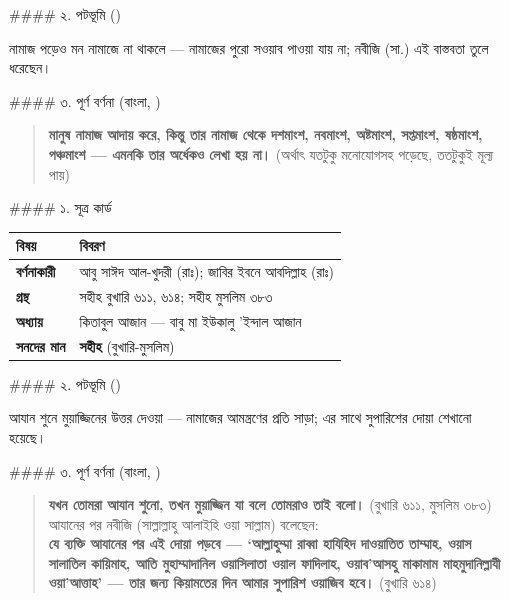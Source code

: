 \#\#\#\# ২. পটভূমি ()

নামাজ পড়েও মন নামাজে না থাকলে — নামাজের পুরো সওয়াব পাওয়া যায় না; নবীজি (সা.) এই বাস্তবতা তুলে ধরেছেন।

\#\#\#\# ৩. পূর্ণ বর্ণনা (বাংলা, )

\begin{quote}
\textbf{মানুষ নামাজ আদায় করে, কিন্তু তার নামাজ থেকে দশমাংশ, নবমাংশ, অষ্টমাংশ, সপ্তমাংশ, ষষ্ঠমাংশ, পঞ্চমাংশ — এমনকি তার অর্ধেকও লেখা হয় না।} (অর্থাৎ যতটুকু মনোযোগসহ পড়েছে, ততটুকুই মূল্য পায়)
\end{quote}

\#\#\#\# ১. সূত্র কার্ড

\begin{table}[h]\centering\small
\begin{tabular}{ll}
বিষয় & বিবরণ \\
\hline
\textbf{বর্ণনাকারী} & আবু সাঈদ আল-খুদরী (রাঃ); জাবির ইবনে আবদিল্লাহ (রাঃ) \\
\textbf{গ্রন্থ} & সহীহ বুখারি ৬১১, ৬১৪; সহীহ মুসলিম ৩৮৩ \\
\textbf{অধ্যায়} & কিতাবুল আজান — বাবু মা ইউকালু 'ইন্দাল আজান \\
\textbf{সনদের মান} & \textbf{সহীহ} (বুখারি-মুসলিম) \\
\hline
\end{tabular}
\end{table}

\#\#\#\# ২. পটভূমি ()

আযান শুনে মুয়াজ্জিনের উত্তর দেওয়া — নামাজের আমন্ত্রণের প্রতি সাড়া; এর সাথে সুপারিশের দোয়া শেখানো হয়েছে।

\#\#\#\# ৩. পূর্ণ বর্ণনা (বাংলা, )

\begin{quote}
\textbf{যখন তোমরা আযান শুনো, তখন মুয়াজ্জিন যা বলে তোমরাও তাই বলো।} (বুখারি ৬১১, মুসলিম ৩৮৩) \\
আযানের পর নবীজি (সাল্লাল্লাহু আলাইহি ওয়া সাল্লাম) বলেছেন: \\
\textbf{যে ব্যক্তি আযানের পর এই দোয়া পড়বে — ‘আল্লাহুম্মা রাব্বা হাযিহিদ দাওয়াতিত তাম্মাহ, ওয়াস সালাতিল কায়িমাহ, আতি মুহাম্মাদানিল ওয়াসিলাতা ওয়াল ফাদিলাহ, ওয়াব'আসহু মাকামাম মাহমুদানিল্লাযী ওয়া'আত্তাহ’ — তার জন্য কিয়ামতের দিন আমার সুপারিশ ওয়াজিব হবে।} (বুখারি ৬১৪)
\end{quote}



